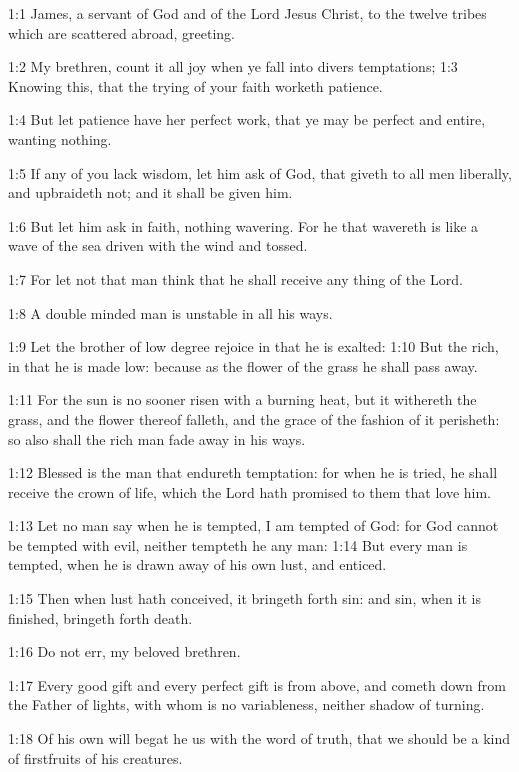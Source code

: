 

1:1 James, a servant of God and of the Lord Jesus Christ, to the twelve tribes which are scattered abroad, greeting.

1:2 My brethren, count it all joy when ye fall into divers temptations; 1:3 Knowing this, that the trying of your faith worketh patience.

1:4 But let patience have her perfect work, that ye may be perfect and entire, wanting nothing.

1:5 If any of you lack wisdom, let him ask of God, that giveth to all men liberally, and upbraideth not; and it shall be given him.

1:6 But let him ask in faith, nothing wavering. For he that wavereth is like a wave of the sea driven with the wind and tossed.

1:7 For let not that man think that he shall receive any thing of the Lord.

1:8 A double minded man is unstable in all his ways.

1:9 Let the brother of low degree rejoice in that he is exalted: 1:10 But the rich, in that he is made low: because as the flower of the grass he shall pass away.

1:11 For the sun is no sooner risen with a burning heat, but it withereth the grass, and the flower thereof falleth, and the grace of the fashion of it perisheth: so also shall the rich man fade away in his ways.

1:12 Blessed is the man that endureth temptation: for when he is tried, he shall receive the crown of life, which the Lord hath promised to them that love him.

1:13 Let no man say when he is tempted, I am tempted of God: for God cannot be tempted with evil, neither tempteth he any man: 1:14 But every man is tempted, when he is drawn away of his own lust, and enticed.

1:15 Then when lust hath conceived, it bringeth forth sin: and sin, when it is finished, bringeth forth death.

1:16 Do not err, my beloved brethren.

1:17 Every good gift and every perfect gift is from above, and cometh down from the Father of lights, with whom is no variableness, neither shadow of turning.

1:18 Of his own will begat he us with the word of truth, that we should be a kind of firstfruits of his creatures.

